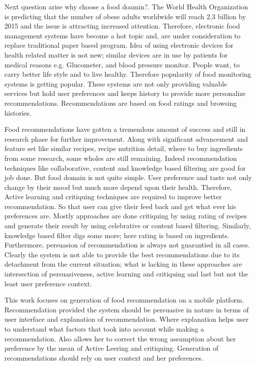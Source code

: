 Next question arise why choose a food doamin?. The World Health Organization \cite{world2008information} is predicting that the number of obese adults worldwide will reach 2.3 billion by 2015 and the issue is attracting increased attention. Therefore, electronic food management systems have become a hot topic and, are under consideration to replace traditional paper based program. Idea of using electronic devices for health related matter is not new; similar devices are in use by patients for medical reasons e.g. Glucometer, and blood pressure monitor. People want, to carry better life style and to live healthy. Therefore popularity of food monitoring systems is getting popular.  These systems are not only providing valuable services but hold user preferences and keeps history to provide more personalize recommendations. Recommendations are based on food ratings and browsing histories.\newline

Food recommendations have gotten a tremendous amount of success and still in research phase for further improvement. Along with significant advancement and feature set like similar recipes, recipe nutrition detail, where to buy ingredients from some research, some wholes are still remaining. Indeed recommendation techniques like collaborative, content and knowledge based filtering are good for job done. But food domain is not quite simple. User preference and taste not only change by their mood but much more depend upon their health. Therefore, Active learning and critiquing techniques are required to improve better recommendation. So that user can give their feed back and get what ever his preferences are. Mostly approaches are done critiquing by using rating of recipes and generate their result by using celebrative or content based filtering. Similarly, knowledge based filter digs some more; here rating is based on ingredients. Furthermore, persuasion of recommendation is always not guarantied in all cases. Clearly the system is not able to provide the best recommendations due to its detachment from the current situation; what is lacking in these approaches are intersection of persuasiveness, active learning and critiquing and last but not the least user preference context.\newline

This work focuses on generation of food recommendation on a mobile platform. Recommendation provided the system should be persuasive in nature in terms of user interface and explanation of recommendation. Where explanation helps user to understand what factors that took into account while making a recommendation. Also allows her to correct the wrong assumption about her preference by the mean of Active Leering and critiquing. Generation of recommendations should rely on user context and her preferences. 
\newline

